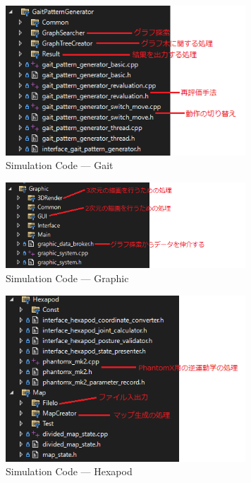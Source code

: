 \begin{figure}[htbp]
  \begin{center}
    \includegraphics[width=90mm, clip]{figure/appendix/C++_Gait.png}
    \caption{Simulation Code --- Gait}
    \label{fig:3} %
  \end{center}
\end{figure}

\begin{figure}[htbp]
  \begin{center}
    \includegraphics[width=90mm, clip]{figure/appendix/C++_Graphic.png}
    \caption{Simulation Code --- Graphic}
    \label{fig:4} %
  \end{center}
\end{figure}

\begin{figure}[htbp]
  \begin{center}
    \includegraphics[width=90mm, clip]{figure/appendix/C++_Hexapod.png}
    \caption{Simulation Code --- Hexapod}
    \label{fig:5} %
  \end{center}
\end{figure}

